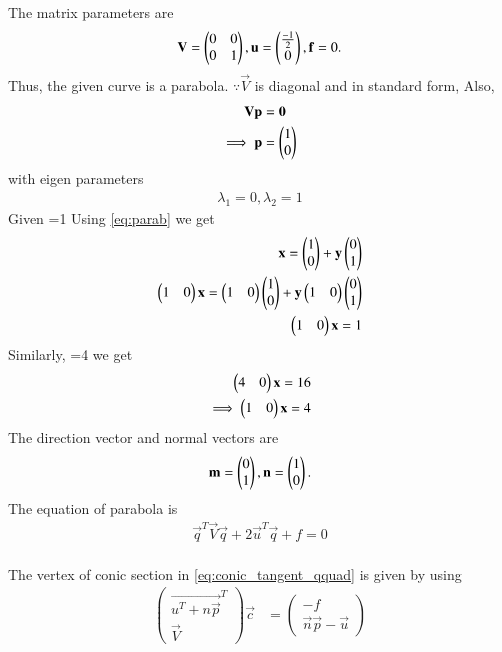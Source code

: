 \documentclass[journal,12pt,twocolumn]{IEEEtran}
\begin{document}
The matrix parameters  are
\begin{align}
\mathbf{V} = \begin{pmatrix}0 & 0\\0 & 1\end{pmatrix}, \mathbf{u} = \begin{pmatrix}\frac{-1}{2}\\0\end{pmatrix}, \mathbf{f}=0.
\label{eq:parab_twovar_params}
\end{align}
Thus, the given curve is a parabola.  $\because \vec{V}$ is diagonal and in standard form,
Also, 
\begin{align}
\mathbf{V}\mathbf{p} &= \mathbf{0}
\\
\implies \mathbf{p} &= \begin{pmatrix}1\\0\end{pmatrix}
\label{eq:parab_twovar_p}
\end{align}
with eigen parameters\\
\begin{align}
\lambda_1=0, \lambda_2=1
\end{align}
Given =1  Using \eqref{eq:parab} we get
\begin{align}
\mathbf{x}=\begin{pmatrix}1\\0\end{pmatrix}+\mathbf{y}\begin{pmatrix}0\\1\end{pmatrix}\\
\begin{pmatrix}1 & 0\end{pmatrix}\mathbf{x}=\begin{pmatrix}1 & 0\end{pmatrix}\begin{pmatrix}1\\0\end{pmatrix}+\mathbf{y}\begin{pmatrix}1 & 0\end{pmatrix}\begin{pmatrix}0\\1\end{pmatrix}\\
\begin{pmatrix}1 & 0\end{pmatrix}\mathbf{x}=1\label{eq:line1}
\end{align}
Similarly, =4 we get
\begin{align}\label{eq:line2}
\begin{pmatrix}4 & 0\end{pmatrix}\mathbf{x}=16\\
\implies\begin{pmatrix}1 & 0\end{pmatrix}\mathbf{x}=4
\end{align}
The direction vector and normal vectors are
\begin{align}
\mathbf{m} = \begin{pmatrix}0\\1\end{pmatrix}, \mathbf{n} = \begin{pmatrix}1\\0\end{pmatrix}.
\label{eq:parab_twovar_mn}
\end{align}
The equation of parabola is
\begin{align}
\vec{q}^T\vec{V}\vec{q} + 2\vec{u}^T\vec{q} +f = 0
\label{eq:conic_tangent_qquad}
\end{align}\\
The vertex of conic section in \eqref{eq:conic_tangent_qquad} is given by  using  
\begin{align}
\label{eq:vertex}
\begin{pmatrix}
\vec{u^T+n \vec{p}}^T \\ \vec{V}
\end{pmatrix}
\vec{c} &= 
\begin{pmatrix}
-f
\\
\vec{n}\vec{p}-\vec{u}
\end{pmatrix}
\end{align}
\end{document}
